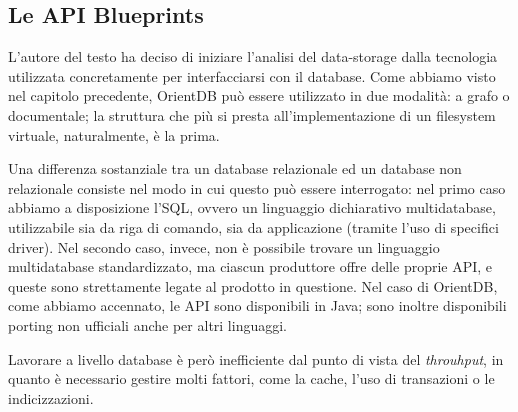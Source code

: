 \subsection{Le API Blueprints}
L'autore del testo ha deciso di iniziare l'analisi del data-storage dalla tecnologia utilizzata concretamente per interfacciarsi con il database. Come abbiamo visto nel capitolo precedente, OrientDB può essere utilizzato in due modalità: a grafo o documentale; la struttura che più si presta all'implementazione di un filesystem virtuale, naturalmente, è la prima.

Una differenza sostanziale tra un database relazionale ed un database non relazionale consiste nel modo in cui questo può essere interrogato: nel primo caso abbiamo a disposizione l'SQL, ovvero un linguaggio dichiarativo multidatabase, utilizzabile sia da riga di comando, sia da applicazione (tramite l'uso di specifici driver). Nel secondo caso, invece, non è possibile trovare un linguaggio multidatabase standardizzato, ma ciascun produttore offre delle proprie API, e queste sono strettamente legate al prodotto in questione. Nel caso di OrientDB, come abbiamo accennato, le API sono disponibili in Java; sono inoltre disponibili porting non ufficiali anche per altri linguaggi. 

Lavorare a livello database è però inefficiente dal punto di vista del \emph{throuhput}, in quanto è necessario gestire molti fattori, come la cache, l'uso di transazioni o le indicizzazioni.

